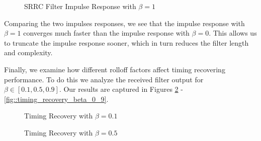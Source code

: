 \documentclass{article}
\begin{document}
\begin{figure}[H]
	\centerline{}
	\caption{SRRC Filter Impulse Response with $\beta=1$}
	\label{fig::srrc_impulse_response_beta_1}
\end{figure}

\noindent Comparing the two impulses responses, we see that the impulse response with $\beta=1$ converges much faster than the impulse response with $\beta=0$. This allows us to truncate the impulse response sooner, which in turn reduces the filter length and complexity.

Finally, we examine how different rolloff factors affect timing recovering performance. To do this we analyze the received filter output for $\beta \in [0.1, 0.5, 0.9]$. Our results are captured in Figures \ref{fig::timing_recovery_beta_0_1} - \ref{fig::timing_recovery_beta_0_9}.

\begin{figure}[H]
	\centerline{}
	\caption{Timing Recovery with $\beta=0.1$}
	\label{fig::timing_recovery_beta_0_1}
\end{figure}

\begin{figure}[H]
	\centerline{}
	\caption{Timing Recovery with $\beta=0.5$}
	\label{fig::timing_recovery_beta_0_5}
\end{figure}
\end{document}
